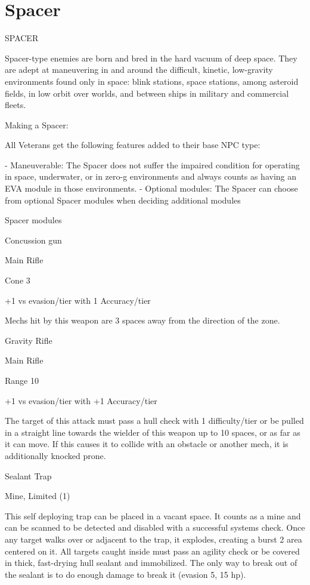 \section{Spacer}
                                                 SPACER  

Spacer-type enemies are born and bred in the hard vacuum of deep space. They are adept at  
maneuvering in and around the difficult, kinetic, low-gravity environments found only in space:  
blink stations, space stations, among asteroid fields, in low orbit over worlds, and between ships  
in military and commercial fleets.     

Making a Spacer:
 
All Veterans get the following features added to their base NPC type:
 
    -    Maneuverable: The Spacer does not suffer the impaired condition for operating in space,  
         underwater, or in zero-g environments and always counts as having an EVA module in  
        those environments.  
    -   Optional modules: The Spacer can choose from optional Spacer modules when  
        deciding additional modules  

Spacer modules
 
Concussion gun
 

                                                                                                           


Main Rifle
 
Cone 3
 
+1 vs evasion/tier with 1 Accuracy/tier
 
Mechs hit by this weapon are 3 spaces away from the direction of the zone.
 

Gravity Rifle
 
Main Rifle
 
Range 10
 
+1 vs evasion/tier with +1 Accuracy/tier
 
The target of this attack must pass a hull check with 1 difficulty/tier or be pulled in a straight line  
towards the wielder of this weapon up to 10 spaces, or as far as it can move. If this causes it to  
collide with an obstacle or another mech, it is additionally knocked prone.
 

Sealant Trap
 
Mine, Limited (1)
 
This self deploying trap can be placed in a vacant space. It counts as a mine and can be  
scanned to be detected and disabled with a successful systems check. Once any target walks  
over or adjacent to the trap, it explodes, creating a burst 2 area centered on it. All targets caught  
inside must pass an agility check or be covered in thick, fast-drying hull sealant and immobilized.  
The only way to break out of the sealant is to do enough damage to break it (evasion 5, 15 hp).
 

